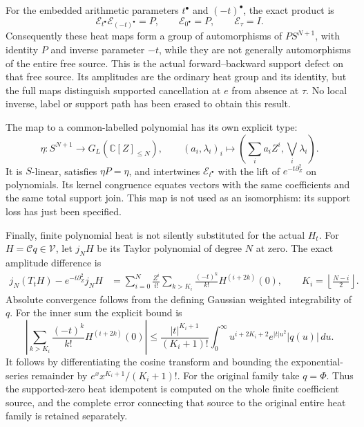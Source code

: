 \documentclass[11pt,a4paper]{article}
\theoremstyle{definition}\newtheorem{definition}[theorem]{Definition}\newtheorem{remark}[theorem]{Remark}
\newcommand{\C}{\mathbb C}\newcommand{\R}{\mathbb R}\newcommand{\Z}{\mathbb Z}\newcommand{\B}{\mathbb B}
\begin{document}
For the embedded arithmetic parameters $t^\bullet$ and $(-t)^\bullet$, the exact product is
\begin{equation}
 \mathcal E_{t^\bullet}\mathcal E_{(-t)^\bullet}=P,
 \qquad \mathcal E_{0^\bullet}=P,
 \qquad \mathcal E_\tau=I.                              \label{eq:twotimezeros}
\end{equation}
Consequently these heat maps form a group of automorphisms of $PS^{N+1}$, with identity $P$ and inverse parameter $-t$, while they are not generally automorphisms of the entire free source. This is the actual forward--backward support defect on that free source. Its amplitudes are the ordinary heat group and its identity, but the full maps distinguish supported cancellation at $e$ from absence at $\tau$. No local inverse, label or support path has been erased to obtain this result.

The map to a common-labelled polynomial has its own explicit type:
\[
 \eta:S^{N+1}\to G_L(\C[Z]_{\le N}),\qquad
 (a_i,\lambda_i)_i\mapsto\left(\sum_i a_iZ^i,\bigvee_i\lambda_i\right).
\]
It is $S$-linear, satisfies $\eta P=\eta$, and intertwines
$\mathcal E_{t^\bullet}$ with the lift of $e^{-t\partial_Z^2}$ on polynomials. Its kernel congruence equates vectors with the same coefficients and the same total support join. This map is not used as an isomorphism: its support loss has just been specified.

Finally, finite polynomial heat is not silently substituted for the actual $H_t$. For $H=\mathcal Cq\in\mathcal V$, let $j_NH$ be its Taylor polynomial of degree $N$ at zero. The exact amplitude difference is
\begin{align}
 j_N(T_tH)-e^{-t\partial_Z^2}j_NH
 &=\sum_{i=0}^N\frac{Z^i}{i!}
       \sum_{k>K_i}\frac{(-t)^k}{k!}H^{(i+2k)}(0),
 \qquad K_i=\left\lfloor\frac{N-i}{2}\right\rfloor.
                                                        \label{eq:jettail}
\end{align}
Absolute convergence follows from the defining Gaussian weighted integrability of $q$. For the inner sum the explicit bound is
\begin{equation}
 \left|\sum_{k>K_i}\frac{(-t)^k}{k!}H^{(i+2k)}(0)\right|
 \le\frac{|t|^{K_i+1}}{(K_i+1)!}
   \int_0^\infty u^{i+2K_i+2}e^{|t|u^2}|q(u)|\,du.
                                                        \label{eq:jetbound}
\end{equation}
It follows by differentiating the cosine transform and bounding the exponential-series remainder by $e^x x^{K_i+1}/(K_i+1)!$. For the original family take $q=\Phi$. Thus the supported-zero heat idempotent is computed on the whole finite coefficient source, and the complete error connecting that source to the original entire heat family is retained separately.
\end{document}
